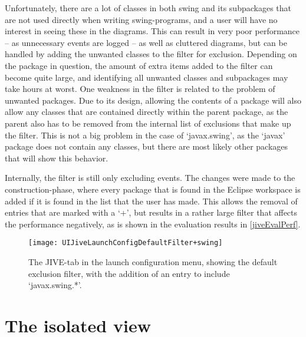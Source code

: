 Unfortunately, there are a lot of classes in both swing and its subpackages that are not used directly when writing swing-programs, and a user will have no interest in seeing these in the diagrams.
This can result in very poor performance -- as unnecessary events are logged -- as well as cluttered diagrams, but can be handled by adding the unwanted classes to the filter for exclusion.
Depending on the package in question, the amount of extra items added to the filter can become quite large, and identifying all unwanted classes and subpackages may take hours at worst.
One weakness in the filter is related to the problem of unwanted packages.
Due to its design, allowing the contents of a package will also allow any classes that are contained directly within the parent package, as the parent also has to be removed from the internal list of exclusions that make up the filter.
This is not a big problem in the case of `javax.swing', as the `javax' package does not contain any classes, but there are most likely other packages that will show this behavior.

Internally, the filter is still only excluding events.
The changes were made to the construction-phase, where every package that is found in the Eclipse workspace is added if it is found in the list that the user has made.
This allows the removal of entries that are marked with a `+', but results in a rather large filter that affects the performance negatively, as is shown in the evaluation results in \cref{jiveEvalPerf}.

\begin{figure}[H]
	\centering
	\texttt{[image: UIJiveLaunchConfigDefaultFilter+swing]}
	\caption[The JIVE-tab in the launch configuration menu]{The JIVE-tab in the launch configuration menu, showing the default exclusion filter, with the addition of an entry to include `javax.swing.*'.}
	\label{fig:UIJiveLaunchConfigDefaultFilter+swing}
\end{figure}

\section{The isolated view}\label{isoView}

